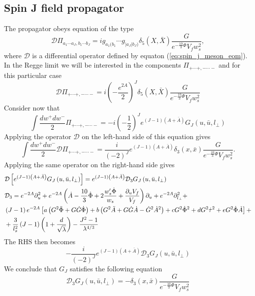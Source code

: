 \documentclass[10 pt]{article}
\begin{document}
\subsection{Spin J field propagator}
The propagator obeys equation of the type
\begin{equation}
\mathcal{D} \Pi_{a_1 \cdots a_J, b_1 \cdots b_J} = i g_{a_1(b_1} \cdots g_{|a_J|b_J)} \delta_5 \left(X, \bar{X}\right) \frac{G}{e^{-\frac{10}{3}\Phi}V_f w_s^2},
\end{equation}
where $\mathcal{D}$ is a differential operator defined by equaton (\ref{eq:spin_j_meson_eom}).
In the Regge limit we will be interested in the components $\Pi_{+\cdots+,-\cdots-}$ and for this particular case
\begin{equation}
\mathcal{D} \Pi_{+\cdots+,-\cdots-} = i {\left( - \frac{e^{2A}}{2}\right)}^J  \delta_5 \left(X, \bar{X}\right) \frac{G}{e^{-\frac{10}{3}\Phi}V_f w_s^2}
\end{equation}
Consider now that
\begin{equation}
\int \frac{dw^+ dw^-}{2} \Pi_{+\cdots+, - \cdots -} = -i {\left(-\frac{1}{2}\right)}^J e^{\left(J-1\right)(A+\bar{A})} G_J \left(u, \bar{u}, l_\perp\right)
\end{equation}
Applying the operator $\mathcal{D}$ on the left-hand side of this equation gives
\begin{equation}
\int \frac{dw^+ dw^-}{2} \mathcal{D} \Pi_{+\cdots+, - \cdots -} = \frac{i}{{\left(-2\right)}^J} e^{\left(J-1\right)\left(A+\bar{A}\right)} \delta_3\left(x, \bar{x}\right) \frac{G}{e^{-\frac{10}{3}\Phi}V_f w_s^2}.
\end{equation}
Applying the same operator on the right-hand side gives
\begin{align}
&\mathcal{D} \left[ e^{\left(J-1\right) \left(A+\bar{A}\right)} G_J \left(u, \bar{u}, l_\perp\right) \right] = e^{\left(J-1\right)\left(A+\bar{A}\right)} \mathcal{D}_3 G_J \left(u, \bar{u}, l_\perp\right) \notag \\
&\mathcal{D}_3 = e^{-2A} \partial_u^2 + e^{-2A} \left( \dot{A} - \frac{10}{3} \dot{\Phi} + 2 \frac{w_s' \dot{\Phi}}{w_s} + \frac{\partial_u V_f}{V_f} \right) \partial_u + e^{-2A} \partial^2_{l_\perp} + \notag \\
& \left(J-1\right) e^{-2A} \left[ a \left(G^2\ddot{\Phi} + G \dot{G} \dot{\Phi} \right) + b \left(G^2 \ddot{A} + G \dot{G} \dot{A} - \dot{G}^2 {\dot{A}}^2\right) + c G^2 {\dot{\Phi}}^2 + d G^2 {\dot{\tau}}^2 + e G^2 \dot{\Phi} \dot{A} \right] + \notag \\
& + \frac{3}{l_s^2} \left(J-1\right)\left(1+\frac{d}{\sqrt{\lambda}}\right) - \frac{J^2-1}{\lambda^{4/3}}
\end{align}
The RHS then becomes
\begin{equation}
- \frac{i}{{\left(-2\right)}^J} e^{\left(J-1\right)\left(A+\bar{A}\right)} \mathcal{D}_3 G_J \left(u, \bar{u}, l_\perp\right)
\end{equation}
We conclude that $G_J$ satisfies the following equation
\begin{equation}
\mathcal{D}_3 G_J \left(u, \bar{u}, l_\perp\right) = - \delta_3 \left(x, \bar{x}\right) \frac{G}{e^{-\frac{10}{3} \Phi} V_f w_s^2}
\label{eq:transverse_propagator}
\end{equation}
\end{document}
